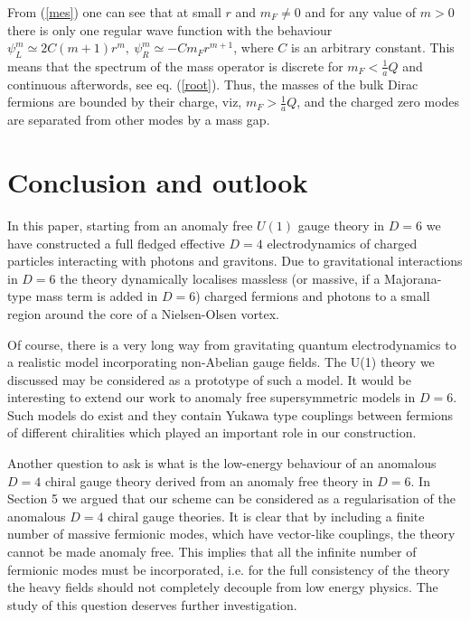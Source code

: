 \documentclass[a4paper,12pt]{article}
\begin{document}
From (\ref{mes}) one can see that at small $r$ and $m_F \neq 0$ and
for any value of $m>0$ there is only one regular wave function with
the behaviour $\psi_L ^{m} \simeq 2C(m+1)r^m,~\psi_R ^{m} \simeq -C m_F
r^{m+1}$, where $C$ is an arbitrary constant. This means that the
spectrum of the mass operator is discrete for $m_F <\frac{1}{a}Q$ and
continuous afterwords, see eq. (\ref{root}). Thus, the masses of the 
bulk  Dirac fermions  are bounded by their charge, viz,  $m_F
>\frac{1}{a}Q$, and the charged zero modes are separated from other
modes by a mass gap.

\section{Conclusion and outlook} 
In this paper, starting from an anomaly free $U(1)$ gauge theory in
$D=6$ we have constructed a full fledged effective $D=4$
electrodynamics of charged particles interacting with photons and
gravitons.  Due to gravitational interactions in $D=6$ the theory
dynamically localises massless (or massive, if a Majorana-type mass
term is added in $D=6$) charged fermions and photons to a small
region around the core of a Nielsen-Olsen vortex. 

Of course, there is a very long way from gravitating quantum
electrodynamics to a realistic model incorporating non-Abelian gauge
fields. The U(1) theory we discussed may be considered as a prototype
of such a model. It would be interesting to extend our work to
anomaly free supersymmetric models in $D=6$.  Such models do exist
\cite{Randjbar-Daemi:wc} and they contain Yukawa type couplings
between fermions of different chiralities which played an important
role in our construction.

Another question to ask is what is the low-energy behaviour of an
anomalous $D=4$  chiral gauge theory derived from an anomaly free
theory in $D=6$. In Section 5 we argued that our scheme can be
considered as a regularisation of the anomalous $D=4$ chiral gauge
theories. It is clear that by including a finite number of massive
fermionic modes, which have vector-like couplings, the theory cannot
be made anomaly free. This implies that all the infinite number of
fermionic modes must be incorporated, i.e. for the full consistency
of the theory the heavy fields should not completely decouple from
low energy physics. The study of this question deserves further
investigation.
\end{document}

